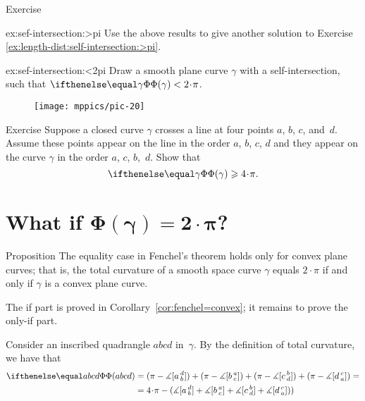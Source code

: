 \pagebreak%

\begin{thm}{Exercise}\label{ex:sef-intersection}


\begin{subthm}{ex:sef-intersection:>pi}  
Use the above results to give another solution to Exercise \ref{ex:length-dist:self-intersection:>pi}. 
\end{subthm}

\begin{subthm}{ex:sef-intersection:<2pi}
Draw a smooth plane curve $\gamma$ with a self-intersection, such that $\tc\gamma<2\cdot\pi$.
\end{subthm}

\end{thm}

\begin{wrapfigure}{r}{30 mm}
\vskip-2mm
\centering
\texttt{[image: mppics/pic-20]}
\vskip0mm
\end{wrapfigure}

\begin{thm}{Exercise}\label{ex:quadrisecant}
Suppose a closed curve $\gamma$ crosses a line at four points $a$, $b$, $c$, and~$d$.
Assume these points appear on the line in the order $a$, $b$, $c$, $d$
and they appear on the curve $\gamma$ in the order $a$, $c$, $b$,~$d$.
Show that 
\[\tc\gamma\ge 4\cdot\pi.\]

\end{thm}

\section[\texorpdfstring{What if $\Phi(\gamma)=2\cdot \pi$?}{What if Φ(γ)=2·π?}]{What if $\bm{\Phi(\gamma)=2\cdot \pi}$?}

\begin{thm}{Proposition}\label{prop:fenchel=}
The equality case in Fenchel's theorem holds only for convex plane curves;
that is, the total curvature of a smooth space curve $\gamma$ equals $2\cdot\pi$ if and only if $\gamma$ is a convex plane curve.
\end{thm}

The if part is proved in Corollary~\ref{cor:fenchel=convex};
it remains to prove the only-if part.

Consider an inscribed quadrangle $abcd$ in~$\gamma$.
By the definition of total curvature, we have that
\begin{align*}
\tc{abcd}&=(\pi-
\measuredangle\hinge adb)+(\pi-
\measuredangle\hinge bac)+(\pi-
\measuredangle\hinge cbd)+(\pi-
\measuredangle\hinge dca)=
\\
&=4\cdot\pi -(
\measuredangle\hinge adb
+
\measuredangle\hinge bac
+
\measuredangle\hinge cbd
+
\measuredangle\hinge dca))
\end{align*}


